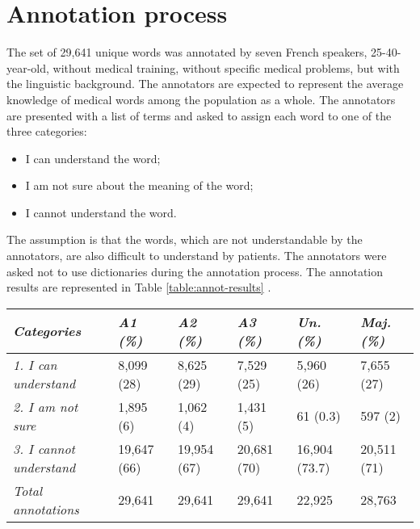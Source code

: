 \section{Annotation process}
\label{sec:annotation-process}
The set of 29,641 unique words was annotated by seven French speakers, 25-40-year-old, without medical training, without specific medical problems, but with the linguistic background. The annotators are expected to represent the average knowledge of medical words among the population as a whole. The annotators are presented with a list of terms and asked to assign each word to one of the three categories:

\begin{itemize}
    \item  I can understand the word;
    \item  I am not sure about the meaning of the word;
    \item  I cannot understand the word.
\end{itemize}
The assumption is that the words, which are not understandable by the annotators, are also difficult to understand by patients. The annotators were asked not to use dictionaries during the annotation process. The annotation results are represented in Table \ref{table:annot-results} .

\begin{table*}[h]
\begin{tabular}{l|lllll}
\hline
\textit{Categories}             & \textit{A1 (\%)} & \textit{A2 (\%)} & \textit{A3 (\%)} & \textit{Un. (\%)} & \textit{Maj. (\%)} \\ \hline
\textit{1. I can understand}    & 8,099 (28)     & 8,625 (29)     & 7,529 (25)     & 5,960 (26)            & 7,655 (27)           \\
\textit{2. I am not sure}       & 1,895 (6)      & 1,062 (4)      & 1,431 (5)      & 61 (0.3)              & 597 (2)              \\
\textit{3. I cannot understand} & 19,647 (66)    & 19,954 (67)    & 20,681 (70)    & 16,904 (73.7)         & 20,511 (71)          \\ \hline
\textit{Total annotations}      & 29,641           & 29,641           & 29,641           & 22,925                  & 28,763                 \\ \hline
\end{tabular}
\caption{Number (and percentage) of words assigned to reference categories by three annotators (A1, A2
and A3), and in the derived unanimity (Un.) and majority (Maj.) datasets.}
\label{table:annot-results}
\end{table*}

